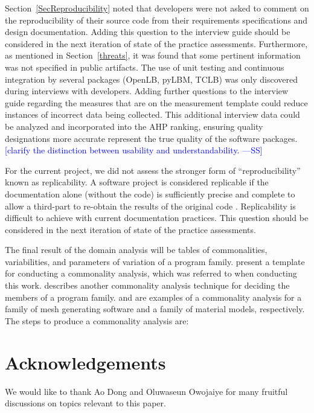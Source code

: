 \documentclass[final, 3p, times, authoryear]{elsarticle}
\newcommand{\authornote}[3]{\textcolor{#1}{[#3 ---#2]}}
\newcommand{\authornote}[3]{}
\newcommand{\wss}[1]{\authornote{blue}{SS}{#1}} %
\begin{document}
Section~\ref{SecReproducibility} noted that developers were not asked to comment
on the reproducibility of their source code from their requirements
specifications and design documentation. Adding this question to the interview
guide should be considered in the next iteration of state of the practice
assessments. Furthermore, as mentioned in Section~\ref{threats}, it was found
that some pertinent information was not specified in public artifacts. The use
of unit testing and continuous integration by several packages (OpenLB, pyLBM,
TCLB) was only discovered during interviews with developers. Adding further
questions to the interview guide regarding the measures that are on the
measurement template could reduce instances of incorrect data being collected.
This additional interview data could be analyzed and incorporated into the AHP
ranking, ensuring quality designations more accurate represent the true quality
of the software packages.  \wss{clarify the distinction between usability and
understandability.}

For the current project, we did not assess the stronger form of
``reproducibility'' known as replicability.  A software project is considered
replicable if the documentation alone (without the code) is sufficiently precise
and complete to allow a third-part to re-obtain the results of the original code
\citep{BenureauAndRougier2017}.  Replicability is difficult to achieve with
current documentation practices.  This question should be considered in the next
iteration of state of the practice assessments. 

The final result of the domain analysis will be tables of commonalities,
variabilities, and parameters of variation of a program family.
\cite{smith2008commonality} present a template for conducting a commonality
analysis, which was referred to when conducting this work.
\cite{weiss1998commonality} describes another commonality analysis technique for
deciding the members of a program family. \cite{SmithAndChen2004} and
\cite{SmithMcCutchanAndCarette2017} are examples of a commonality analysis for a
family of mesh generating software and a family of material models,
respectively. The steps to produce a commonality analysis are:

\section*{Acknowledgements}

We would like to thank Ao Dong and Oluwaseun Owojaiye for many fruitful
discussions on topics relevant to this paper.



\end{document}
